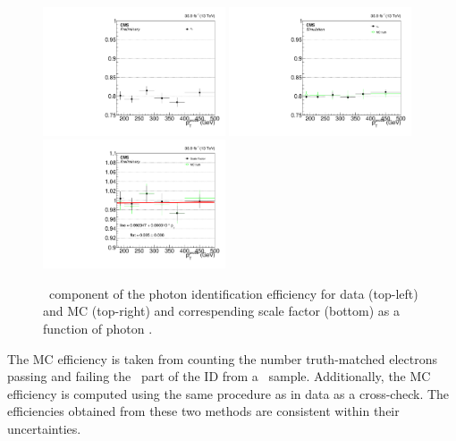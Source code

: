\begin{figure}[htbp]
  \begin{center}
    \includegraphics[width=0.48\textwidth]{Calibration/Figures/idsf/eff_data_ptalt.pdf}
    \includegraphics[width=0.48\textwidth]{Calibration/Figures/idsf/eff_mc_ptalt.pdf}
    \includegraphics[width=0.48\textwidth]{Calibration/Figures/idsf/scaleFactor_ptalt.pdf}
    \caption{
      \egamma\ component of the photon identification efficiency for data (top-left) and MC (top-right) and correspending scale factor (bottom) as a function of photon \pt.
    }
    \label{fig:idsf_results}
  \end{center}
\end{figure}

The MC efficiency is taken from counting the number truth-matched electrons passing and failing the \egamma\ part of the ID from a \Zee\ sample. 
Additionally, the MC efficiency is computed using the same procedure as in data as a cross-check.
The efficiencies obtained from these two methods are consistent within their uncertainties. 

